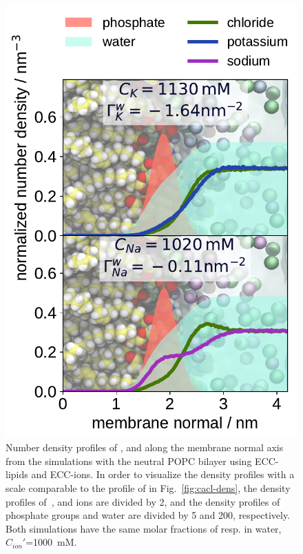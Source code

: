 \begin{figure}[tbp!] 
  \centering 
  \includegraphics[width=\figwidth]{../img/ecc_popc/density_profiles_ca_cl_wat_phos_models-compar_5-7_NaCl-KCl.pdf}
  \caption{\label{fig:nacl-dens} 
    Number density profiles of ,  and  along the membrane normal axis 
    from the simulations with the neutral POPC bilayer using ECC-lipids and ECC-ions.  
    In order to visualize the density profiles with a scale comparable to the profile of  in Fig.~\ref{fig:cacl-dens},  
    the density profiles of~,  and  ions are divided by 2, and 
    the density profiles of phosphate groups and water are divided by 5 and 200, respectively.  
    Both simulations have the same molar fractions of  resp.  in water, $C_{ion}'$=1000~mM. 
    } 
\end{figure} 


